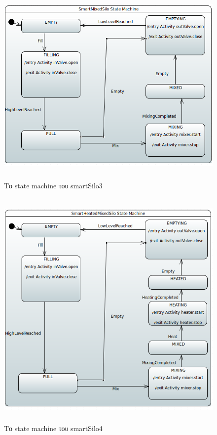\begin{figure}[htbp]
	\centering
		\includegraphics[height=10cm,width=15cm]{Figures/19.png}
	\caption{Το state machine του smartSilo3}	
\end{figure}
\begin{figure}[htbp]
	\centering
		\includegraphics[height=12cm,width=15cm]{Figures/20.png}
	\caption{Το state machine του smartSilo4}	
\end{figure}




